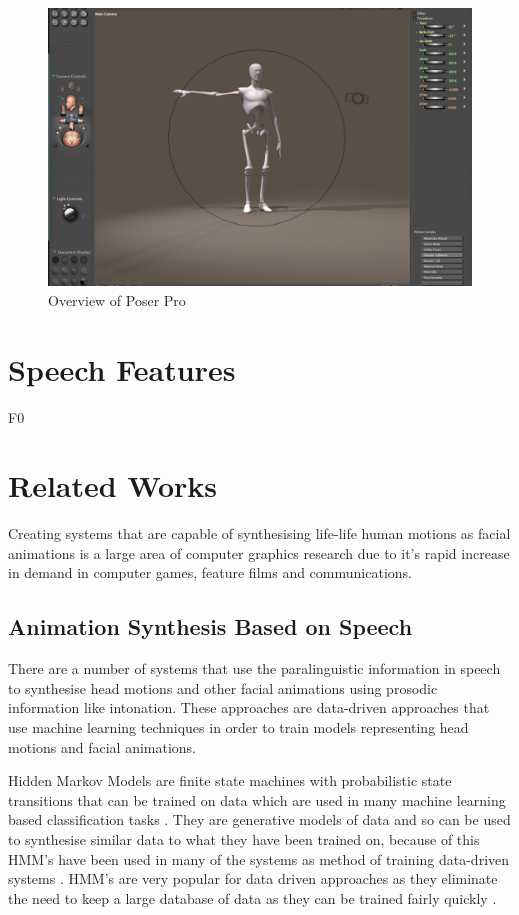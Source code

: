 \documentclass[bsc,frontabs,twoside,singlespacing,parskip]{infthesis}
\begin{document}
\begin{figure}
	\centering
		\includegraphics[width=1.0\textwidth]{poser.png}
		\caption{Overview of Poser Pro}
\end{figure}

\section{Speech Features}

F0

\section{Related Works}

Creating systems that are capable of synthesising life-life human motions as facial animations is a large area of computer graphics research due to it's rapid increase in demand in computer games, feature films and communications.

\subsection{Animation Synthesis Based on Speech}

There are a number of systems that use the paralinguistic information in speech to synthesise head motions and other facial animations using prosodic information like intonation. These approaches are data-driven approaches that use machine learning techniques in order to train models representing head motions and facial animations.

Hidden Markov Models are finite state machines with probabilistic state transitions that can be trained on data which are used in many machine learning based classification tasks \cite{hmms}. They are generative models of data and so can be used to synthesise similar data to what they have been trained on, because of this HMM's have been used in many of the systems as method of training data-driven systems \cite{puppetry}.  HMM's are very popular for data driven approaches as they eliminate the need to keep a large database of data as they can be trained fairly quickly \cite{expressive_speech_animation}. 
\end{document}
